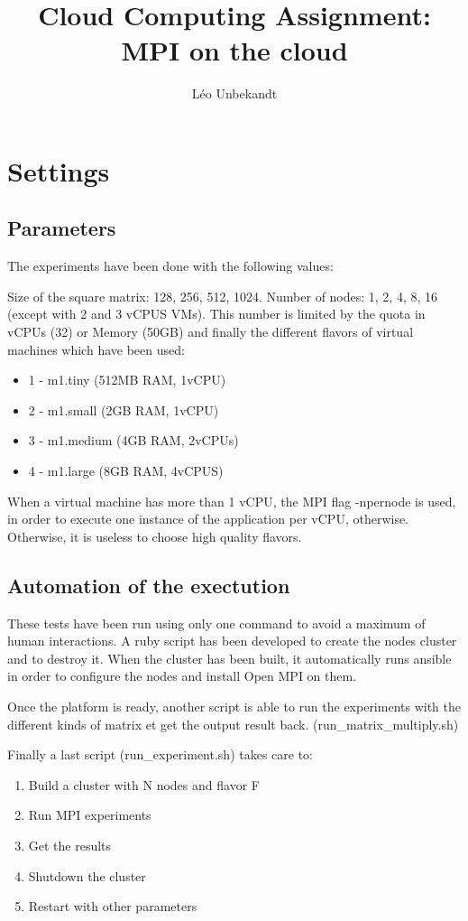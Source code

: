 \documentclass[a4paper,11pt]{article}
\title{Cloud Computing Assignment: MPI on the cloud}
\author{Léo Unbekandt}
\begin{document}
\maketitle
\tableofcontents

\section{Settings}
\subsection{Parameters}

The experiments have been done with the following values:

Size of the square matrix: 128, 256, 512, 1024.
Number of nodes: 1, 2, 4, 8, 16 (except with 2 and 3 vCPUS VMs). This number
is limited by the quota in vCPUs (32) or Memory (50GB) and finally the
different flavors of virtual machines which have been used:
\begin{itemize}
  \item 1 - m1.tiny (512MB RAM, 1vCPU)
  \item 2 - m1.small (2GB RAM, 1vCPU)
  \item 3 - m1.medium (4GB RAM, 2vCPUs)
  \item 4 - m1.large (8GB RAM, 4vCPUS)
\end{itemize}

When a virtual machine has more than 1 vCPU, the MPI flag -npernode is used, in order
to execute one instance of the application per vCPU, otherwise. Otherwise, it is
useless to choose high quality flavors.

\subsection{Automation of the exectution}

These tests have been run using only one command to avoid a maximum of human
interactions. A ruby script has been developed to create the nodes cluster and to
destroy it. When the cluster has been built, it automatically runs ansible in
order to configure the nodes and install Open MPI on them.

Once the platform is ready, another script is able to run the experiments with
the different kinds of matrix et get the output result back. (run\_matrix\_multiply.sh)

Finally a last script (run\_experiment.sh) takes care to:
\begin{enumerate}
  \item Build a cluster with N nodes and flavor F
  \item Run MPI experiments
  \item Get the results
  \item Shutdown the cluster
  \item Restart with other parameters
\end{enumerate}
\end{document}
